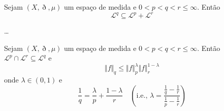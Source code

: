 \documentclass[a4paper, 11pt]{book}
\theoremstyle{definition}
\newcommand{\cL}{\mathcal{L}}
\begin{document}
\begin{pbox}
    Sejam $(X,\eth,\mu)$ um espaço de medida e  $0 < p < q < r \leqslant \infty$.
    Então
    \[
        \cL^q \subseteq \cL^p + \cL^r
    \]
\end{pbox}
\begin{prf}
    \dots
\end{prf}

\begin{tbox} \label{thm:desigualdade-de-inteporlacao}
    Sejam $(X,\eth,\mu)$ um espaço de medida e $0 < p < q < r \leqslant \infty$.
    Então $\cL^p \cap \cL^r \subseteq \cL^q$ e
    \[
        \Vert f \Vert_q \leqslant \Vert f \Vert_p^\lambda \Vert f \Vert_r^{1 - \lambda}
    \]
    onde $\lambda \in (0,1)$ e
    \begin{equation} \label{eq:3}
        \frac{1}{q} = \frac{\lambda}{p} + \frac{1 - \lambda}{r} \quad \left( \text{i.e., } \lambda = \frac{\frac{1}{q} - \frac{1}{r}}{\frac{1}{p} - \frac{1}{r}}\right)
    \end{equation}
\end{tbox}
\end{document}

